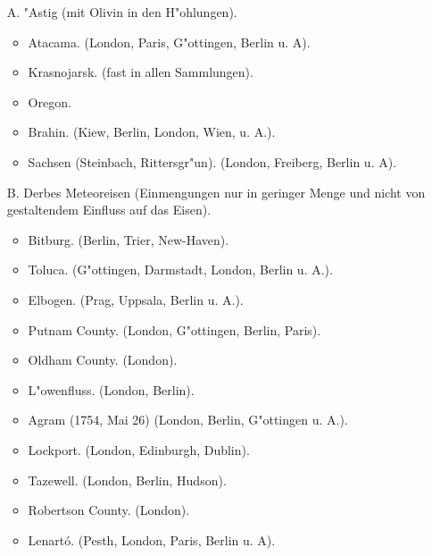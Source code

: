 \documentclass[a4paper, 11pt, oneside]{article}
\begin{document}
\begin{itemize}
    \item[A.] "Astig (mit Olivin in den H"ohlungen).
    \begin{itemize}
        \item Atacama. (London, Paris, G"ottingen, Berlin u. A).

        \item Krasnojarsk. (fast in allen Sammlungen).
    
        \item Oregon.
    
        \item Brahin. (Kiew, Berlin, London, Wien, u. A.).
    
        \item Sachsen (Steinbach, Rittersgr"un). (London, Freiberg, Berlin u. A).
    \end{itemize}
    \item[B.] Derbes Meteoreisen (Einmengungen nur in geringer Menge und nicht von gestaltendem Einfluss auf das Eisen).
    \begin{itemize}
        \item Bitburg. (Berlin, Trier, New-Haven).

        \item Toluca. (G"ottingen, Darmstadt, London, Berlin u. A.).
    
        \item Elbogen. (Prag, Uppsala, Berlin u. A.).

        \item Putnam County. (London, G"ottingen, Berlin, Paris).
    
        \item Oldham County. (London).
    
        \item L"owenfluss. (London, Berlin).
    
        \item Agram (1754, Mai 26) (London, Berlin, G"ottingen u. A.).
    
        \item Lockport. (London, Edinburgh, Dublin).
    
        \item Tazewell. (London, Berlin, Hudson).
    
        \item Robertson County. (London).
    
        \item Lenartó. (Pesth, London, Paris, Berlin u. A).
    

\end{itemize}
\end{itemize}
\end{document}
